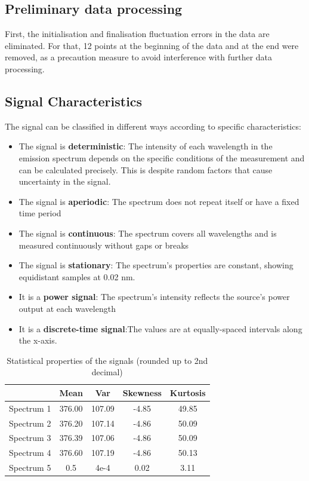 \subsection{Preliminary data processing}
First, the initialisation and finalisation fluctuation errors in the data are eliminated. For that, 12 points at the beginning of the data and at the end were removed, as a precaution measure to avoid interference with further data processing.


\subsection{Signal Characteristics}
The signal can be classified in different ways according to specific characteristics:
\begin{itemize}
    \item The signal is \textbf{deterministic}\cite{detSig}: The intensity of each wavelength in the emission spectrum depends on the specific conditions of the measurement and can be calculated precisely. This is despite random factors that cause uncertainty in the signal.
    \item The signal is \textbf{aperiodic}: The spectrum does not repeat itself or have a fixed time period
    \item The signal is \textbf{continuous}: The spectrum covers all wavelengths and is measured continuously without gaps or breaks
    \item The signal is \textbf{stationary}: The spectrum's properties are constant, showing equidistant samples at 0.02 nm.
    \item It is a \textbf{power signal}: The spectrum's intensity reflects the source's power output at each wavelength
    \item It is a \textbf{discrete-time signal}\cite{sigClas}:The values are at equally-spaced intervals along the x-axis.
\end{itemize}
\begin{table}[H]
    \centering
    \caption{Statistical properties of the signals (rounded up to 2nd decimal)}
    \begin{tabular}{|c|c|c|c|c|}
    \centering
    \textbf{} & \textbf{Mean} & \textbf{Var} &  \textbf{Skewness} & \textbf{Kurtosis}\\ \hline \hline
Spectrum 1   & 376.00    & 107.09    & -4.85 & 49.85 \\ \hline   
Spectrum 2   & 376.20    & 107.14    & -4.86 & 50.09 \\ \hline
Spectrum 3   & 376.39    & 107.06    & -4.86 & 50.09 \\ \hline
Spectrum 4   & 376.60    & 107.19    & -4.86 & 50.13 \\ \hline
Spectrum 5   & 0.5    & 4e-4    & 0.02 & 3.11
    \end{tabular}
    \label{tab:table1}
\end{table}
